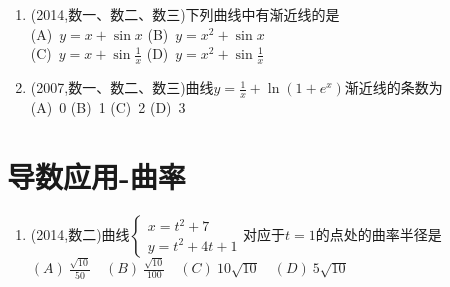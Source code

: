 \documentclass[12pt, a4paper, oneside, UTF8]{ctexbook}
\begin{document}
\begin{enumerate}[label=\arabic*.,start=13]
    \item  (2014,数一、数二、数三)下列曲线中有渐近线的是 \\
        (A)\ $y=x+\sin x$ \qquad (B)\ $y=x^2+\sin x$ \\
        (C)\ $y=x+\sin\frac{1}{x}$ \qquad (D)\ $y=x^2+\sin\frac{1}{x}$
    
    \begin{solution}
    \newpage
    \end{solution}
    
    \item  (2007,数一、数二、数三)曲线$y=\frac{1}{x}+\ln(1+e^x)$渐近线的条数为 \\
        (A)\ 0 \qquad (B)\ 1 \qquad (C)\ 2 \qquad (D)\ 3
    
    \begin{solution}
    \newpage
    \end{solution}
\end{enumerate}

\section{导数应用-曲率}

\begin{enumerate}[label=\arabic*.,start=15]
    \item  (2014,数二)曲线$\begin{cases}
        x=t^2+7 \\
        y=t^2+4t+1
    \end{cases}$对应于$t=1$的点处的曲率半径是 \\
        $(A)\ \frac{\sqrt{10}}{50} \quad (B)\ 
        \frac{\sqrt{10}}{100} \quad (C)\ 10\sqrt{10} \quad (D)\ 5\sqrt{10}$
    
    \begin{solution}
    \newpage
    \end{solution}
\end{enumerate}
\end{document}
